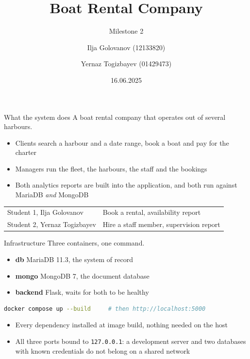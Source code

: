 \documentclass[aspectratio=169, 11pt]{beamer}
\title{Boat Rental Company}
\subtitle{Milestone 2}
\author{Ilja Golovanov (12133820) \and Yernaz Togizbayev (01429473)}
\institute{Group 05 \quad\textbar\quad 052400-1 VU Information Management and Systems Engineering}
\date{16.06.2025}
\begin{document}
\begin{frame}[plain]
  \titlepage
\end{frame}

\begin{frame}{What the system does}
  A boat rental company that operates out of several harbours.
  \begin{itemize}
    \item Clients search a harbour and a date range, book a boat and pay for
          the charter
    \item Managers run the fleet, the harbours, the staff and the bookings
    \item Both analytics reports are built into the application, and both run
          against MariaDB \emph{and} MongoDB
  \end{itemize}
  \vfill
  \begin{center}
  \begin{tabular}{ll}
    \toprule
    Student 1, Ilja Golovanov     & Book a rental, availability report \\
    Student 2, Yernaz Togizbayev  & Hire a staff member, supervision report \\
    \bottomrule
  \end{tabular}
  \end{center}
\end{frame}

\begin{frame}[fragile]{Infrastructure}
  Three containers, one command.
  \begin{itemize}
    \item \textbf{db} \textendash{} MariaDB 11.3, the system of record
    \item \textbf{mongo} \textendash{} MongoDB 7, the document database
    \item \textbf{backend} \textendash{} Flask, waits for both to be healthy
  \end{itemize}
  \begin{lstlisting}[language=bash]
docker compose up --build     # then http://localhost:5000
  \end{lstlisting}
  \begin{itemize}
    \item Every dependency installed at image build, nothing needed on the host
    \item All three ports bound to \texttt{127.0.0.1}: a development server and
          two databases with known credentials do not belong on a shared network
  \end{itemize}
\end{frame}
\end{document}
